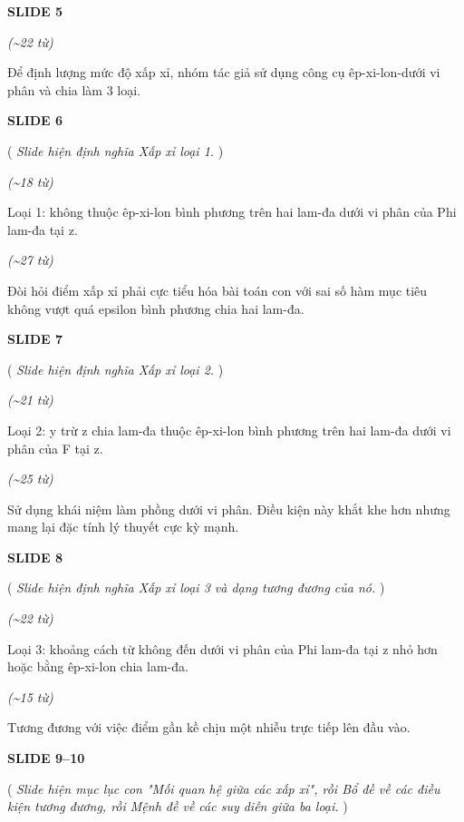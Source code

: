 ﻿\documentclass[12pt]{article}
\newcommand{\scene}[1]{
    \vspace{18pt}
    \normalsize
    \noindent\textbf{\MakeUppercase{#1}}
    \vspace{12pt}
}
\newcommand{\action}[1]{
    \vspace{6pt}
    \small
    \noindent(\textit{#1})
    \vspace{6pt}
}
\newenvironment{speech}{
    \normalsize
    \begin{list}{}{
        \leftmargin=1.25in
        \rightmargin=1.25in
        \parsep=0pt
        \topsep=0pt
        \partopsep=0pt
    }
    \item[]
}{
    \end{list}
    \vspace{6pt}
}
\newcommand{\block}[1]{
    \vspace{4pt}
    \noindent\hspace{1.5in}\textit{(\textasciitilde #1 từ)}
}
\begin{document}
\scene{SLIDE 5}

\block{22}
\begin{speech}
    Để định lượng mức độ xấp xỉ, nhóm tác giả sử dụng công cụ êp-xi-lon-dưới vi phân và chia làm 3 loại.
\end{speech}

\scene{SLIDE 6}

\action{
    Slide hiện định nghĩa Xấp xỉ loại 1.
}

\block{18}
\begin{speech}
    Loại 1: không thuộc êp-xi-lon bình phương trên hai lam-đa dưới vi phân của Phi lam-đa tại z.
\end{speech}

\block{27}
\begin{speech}
    Đòi hỏi điểm xấp xỉ phải cực tiểu hóa bài toán con với sai số hàm mục tiêu không vượt quá epsilon bình phương chia hai lam-đa.
\end{speech}

\scene{SLIDE 7}

\action{
    Slide hiện định nghĩa Xấp xỉ loại 2.
}

\block{21}
\begin{speech}
    Loại 2: y trừ z chia lam-đa thuộc êp-xi-lon bình phương trên hai lam-đa dưới vi phân của F tại z.
\end{speech}

\block{25}
\begin{speech}
    Sử dụng khái niệm làm phồng dưới vi phân. Điều kiện này khắt khe hơn nhưng mang lại đặc tính lý thuyết cực kỳ mạnh.
\end{speech}

\scene{SLIDE 8}

\action{
    Slide hiện định nghĩa Xấp xỉ loại 3 và dạng tương đương của nó.
}

\block{22}
\begin{speech}
    Loại 3: khoảng cách từ không đến dưới vi phân của Phi lam-đa tại z nhỏ hơn hoặc bằng êp-xi-lon chia lam-đa.
\end{speech}

\block{15}
\begin{speech}
    Tương đương với việc điểm gần kề chịu một nhiễu trực tiếp lên đầu vào.
\end{speech}

\scene{SLIDE 9--10}

\action{
    Slide hiện mục lục con "Mối quan hệ giữa các xấp xỉ", rồi Bổ đề về các điều kiện tương đương, rồi Mệnh đề về các suy diễn giữa ba loại.
}
\end{document}
